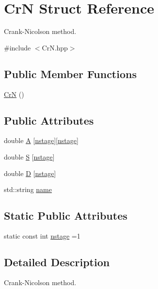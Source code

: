 \hypertarget{structCrN}{\section{Cr\-N Struct Reference}
\label{structCrN}
}


Crank-\/\-Nicolson method.  




{\ttfamily \#include $<$Cr\-N.\-hpp$>$}

\subsection*{Public Member Functions}
\begin{DoxyCompactItemize}
\item 
\hyperlink{structCrN_a19e3e074f81110f1608910d147c1a729}{Cr\-N} ()
\end{DoxyCompactItemize}
\subsection*{Public Attributes}
\begin{DoxyCompactItemize}
\item 
double \hyperlink{structCrN_a36447c4e1eeb7a7bf041ef07d14af800}{A} \mbox{[}\hyperlink{structCrN_a12f815846079fb57b5e0a1ce90bd3ce3}{nstage}\mbox{]}\mbox{[}\hyperlink{structCrN_a12f815846079fb57b5e0a1ce90bd3ce3}{nstage}\mbox{]}
\item 
double \hyperlink{structCrN_a18d10959411a859b1ef1d22faa1d7237}{S} \mbox{[}\hyperlink{structCrN_a12f815846079fb57b5e0a1ce90bd3ce3}{nstage}\mbox{]}
\item 
double \hyperlink{structCrN_a9e93927565356113802fa9cbf2515f5b}{D} \mbox{[}\hyperlink{structCrN_a12f815846079fb57b5e0a1ce90bd3ce3}{nstage}\mbox{]}
\item 
std\-::string \hyperlink{structCrN_af61c6f566ad4f13a2ff01cb83e863e67}{name}
\end{DoxyCompactItemize}
\subsection*{Static Public Attributes}
\begin{DoxyCompactItemize}
\item 
static const int \hyperlink{structCrN_a12f815846079fb57b5e0a1ce90bd3ce3}{nstage} =1
\end{DoxyCompactItemize}


\subsection{Detailed Description}
Crank-\/\-Nicolson method. 

